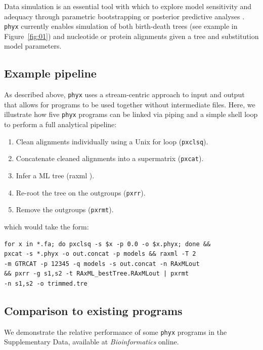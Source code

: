\documentclass{bioinfo}
\begin{document}
\begin{methods}
Data simulation is an essential tool with which to explore model
sensitivity and adequacy through parametric bootstrapping or posterior
predictive analyses \citep{Bollback2002}. \texttt{phyx} currently enables
simulation of both
birth-death trees (see example in Figure~\ref{fig:01}) and nucleotide or
protein alignments given a tree and substitution model parameters.

\subsection{Example pipeline}%

As described above, \texttt{phyx} uses a stream-centric approach to input and output that allows for programs to be used together without intermediate files. Here, we illustrate how five \texttt{phyx} programs can be linked via piping
and a simple shell loop to perform a full analytical pipeline:
\begin{enumerate}
\item Clean alignments individually using a Unix for loop (\texttt{pxclsq}).
\item Concatenate cleaned alignments into a supermatrix (\texttt{pxcat}).
\item Infer a ML tree (raxml \citep{Stamatakis2014}).
\item Re-root the tree on the outgroups (\texttt{pxrr}).
\item Remove the outgroups (\texttt{pxrmt}).
\end{enumerate}
which would take the form:

\begin{verbatim}
for x in *.fa; do pxclsq -s $x -p 0.0 -o $x.phyx; done &&
pxcat -s *.phyx -o out.concat -p models && raxml -T 2
-m GTRCAT -p 12345 -q models -s out.concat -n RAxMLout
&& pxrr -g s1,s2 -t RAxML_bestTree.RAxMLout | pxrmt
-n s1,s2 -o trimmed.tre
\end{verbatim}

\subsection{Comparison to existing programs}


We demonstrate the relative performance of some \texttt{phyx} programs in
the Supplementary Data, available at \textit{Bioinformatics} online.

\end{methods}
\end{document}
